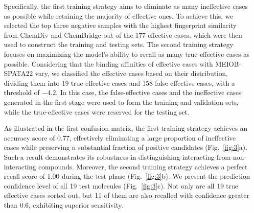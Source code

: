 \documentclass[preprint,12pt]{elsarticle}
\theoremstyle{plain}
\theoremstyle{definition}
\theoremstyle{remark}
\begin{document}
Specifically, the first training strategy aims to eliminate as many ineffective cases as possible while retaining the majority of effective ones. To achieve this, we selected the top three negative samples with the highest fingerprint similarity from ChemDiv and ChemBridge out of the 177 effective cases, which were then used to construct the training and testing sets. The second training strategy focuses on maximizing the model's ability to recall as many true effective cases as possible. Considering that the binding affinities of effective cases with MEIOB-SPATA22 vary, we classified the effective cases based on their distribution, dividing them into 19 true effective cases and 158 false effective cases, with a threshold of $-4.2$. In this case, the false-effective cases and the ineffective cases generated in the first stage were used to form the training and validation sets, while the true-effective cases were reserved for the testing set.

As illustrated in the first confusion matrix, the first training strategy achieves an accuracy score of 0.77, effectively eliminating a large proportion of ineffective cases while preserving a substantial fraction of positive candidates (Fig.~\ref{fig:3}a). Such a result demonstrates its robustness in distinguishing interacting from non-interacting compounds. Moreover, the second training strategy achieves a perfect recall score of 1.00 during the test phase (Fig.~\ref{fig:3}b). We present the prediction confidence level of all 19 test molecules (Fig.~\ref{fig:3}c). Not only are all 19 true effective cases sorted out, but 11 of them are also recalled with confidence greater than 0.6, exhibiting superior sensitivity. 
\end{document}
